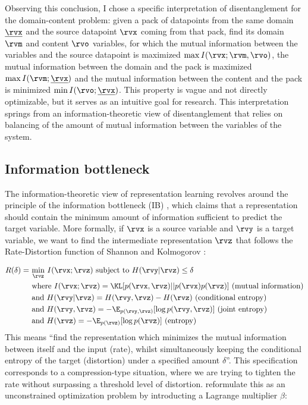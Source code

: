 \documentclass[withindex,glossary,firstyr,times]{cam-thesis}
\begin{document}
Observing this conclusion, I chose a specific interpretation of disentanglement for the domain-content problem: given a pack of datapoints from the same domain $\underline{\rvx}$ and the source datapoint $\rvx$ coming from that pack, find its domain $\rvm$ and content $\rvo$ variables, for which the mutual information between the variables and the source datapoint is maximized $\max I(\rvx ; \rvm, \rvo)$, the mutual information between the domain and the pack is maximized $\max I(\rvm ; \underline{\rvx})$ and the mutual information between the content and the pack is minimized $\min I(\rvo ; \underline{\rvx})$. This property is vague and not directly optimizable, but it serves as an intuitive goal for research. This interpretation springs from an information-theoretic view of disentanglement that relies on balancing of the amount of mutual information between the variables of the system.

\subsection{Information bottleneck}

The information-theoretic view of representation learning revolves around the principle of the information bottleneck (IB) \cite{tishby2000information}, which claims that a representation should contain the minimum amount of information sufficient to predict the target variable. More formally, if $\rvx$ is a source variable and $\rvy$ is a target variable, we want to find the intermediate representation $\rvz$ that follows the Rate-Distortion function of Shannon and Kolmogorov \cite{cover1999elements}:

\begin{align}
    R(\delta) = ~ &\underset{\rvz}{\min} ~ I(\rvx; \rvz) ~ \text{subject to} ~ H(\rvy | \rvz) \leq \delta \\
    &\text{where} ~ I(\rvx; \rvz) = \KL[p(\rvx, \rvz) || p(\rvx) p(\rvz)] ~ \text{(mutual information)} \\
    &\text{and} ~ H(\rvy | \rvz) = H(\rvy, \rvz) - H(\rvz) ~ \text{(conditional entropy)} \\
    &\text{and} ~ H(\rvy, \rvz) = - \E_{p(\rvy, \rvz)} [\log p(\rvy, \rvz)] ~ \text{(joint entropy)} \\
    &\text{and} ~ H(\rvz) = - \E_{p(\rvz)} [\log p(\rvz)] ~ \text{(entropy)}
\end{align}
This means ``find the representation which minimizes the mutual information between itself and the input (rate), whilst simultaneously keeping the conditional entropy of the target (distortion) under a specified amount $\delta$''. This specification corresponds to a compression-type situation, where we are trying to tighten the rate without surpassing a threshold level of distortion. \citet{tishby2000information} reformulate this as an unconstrained optimization problem by introducting a Lagrange multiplier $\beta$:
\end{document}
